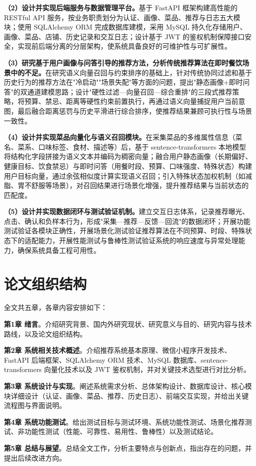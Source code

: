 \textbf{（2）设计并实现后端服务与数据管理平台。}基于 FastAPI 框架构建高性能的 RESTful API 服务，按业务职责划分为认证、画像、菜品、推荐与日志五大模块；使用 SQLAlchemy ORM 完成数据库建模，采用 MySQL 持久化存储用户、画像、菜品、店铺、历史记录和交互日志；设计基于 JWT 的鉴权机制保障接口安全，实现前后端分离的分层架构，使系统具备良好的可维护性与可扩展性。

\textbf{（3）研究基于用户画像与问答引导的推荐方法，分析传统推荐算法在即时餐饮场景中的不足。}在研究语义向量召回与约束排序的基础上，针对传统协同过滤和基于历史行为的推荐方法在"冷启动""场景失配"等方面的问题，提出"静态画像+即时问答"的双通道建模思路；设计"硬性过滤---向量召回---综合重排"的三段式推荐策略，将预算、禁忌、距离等硬性约束前置执行，再通过语义向量捕捉用户当前意图，最后融合距离惩罚与历史平滑进行综合排序，使推荐结果兼顾可执行性与场景一致性。

\textbf{（4）设计并实现菜品向量化与语义召回模块。}在采集菜品的多维属性信息（菜名、菜系、口味标签、食材、描述等）后，基于 sentence-transformers 本地模型将结构化字段拼接为语义文本并编码为稠密向量；融合用户静态画像（长期偏好、健康目标、饮食禁忌）与即时问答（用餐时段、预算、口味强度、特殊状态）构建用户目标向量，通过余弦相似度计算实现语义召回；引入特殊状态加权机制（如减脂、胃不舒服等场景），对召回结果进行场景化增强，提升推荐结果与当前状态的匹配度。

\textbf{（5）设计并实现数据闭环与测试验证机制。}建立交互日志体系，记录推荐曝光、点击、确认和负样本行为，形成"采集---推荐---反馈---回流"的数据闭环；开展功能测试验证各模块正确性，开展场景化测试验证推荐算法在不同预算、时段、特殊状态下的适配能力，开展性能测试与鲁棒性测试验证系统的响应速度与异常处理能力，确保系统具备工程可用性。

\section{论文组织结构}

全文共五章，各章内容安排如下：

\textbf{第1章 绪言}。介绍研究背景、国内外研究现状、研究意义与目的、研究内容与技术路线，以及论文组织结构。

\textbf{第2章 系统相关技术概述}。介绍推荐系统基本原理、微信小程序开发技术、FastAPI 后端框架、SQLAlchemy ORM 技术、MySQL 数据库、sentence-transformers 向量化技术以及 JWT 鉴权机制，并对关键技术选型进行对比分析。

\textbf{第3章 系统设计与实现}。阐述系统需求分析、总体架构设计、数据库设计、核心模块详细设计（认证、画像、菜品、推荐、历史日志）、前端交互实现，并给出关键流程图与界面说明。

\textbf{第4章 系统功能测试}。给出测试目标与测试环境、系统功能性测试、场景化推荐测试、非功能性测试（性能、可靠性、易用性、鲁棒性）以及测试结论。

\textbf{第5章 总结与展望}。总结全文工作，分析主要特点与创新点，指出存在的问题，并提出后续改进方向。
